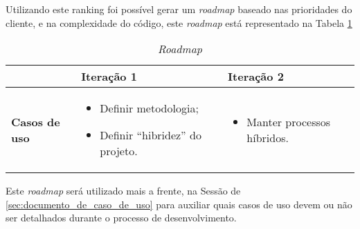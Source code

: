 Utilizando este ranking foi possível gerar um \textit{roadmap} baseado nas prioridades do cliente, e na complexidade do código, este \textit{roadmap} está representado na Tabela \ref{tab:primeiro_roadmap}  

\vspace{5mm}
\begin{table}[H]
\centering
\begin{tabular}{p{1cm}|p{6cm}|p{}|}

\cline{2-3} &
\textbf{Iteração 1} &
\textbf{Iteração 2}
\\ \hline
\multicolumn{1}{|p{1cm}|}{\textbf{Casos de uso}} &
\begin{itemize}
 	\item Definir metodologia;
 	\item Definir ``hibridez'' do projeto.
\end{itemize} &
\begin{itemize}
 	\item Manter processos híbridos.
 \end{itemize} 
 \\ \hline
\end{tabular}
\caption{\textit{Roadmap}}
\label{tab:primeiro_roadmap}
\end{table}

Este \textit{roadmap} será utilizado mais a frente, na Sessão de \ref{sec:documento_de_caso_de_uso} para auxiliar quais casos de uso devem ou não ser detalhados durante o processo de desenvolvimento.